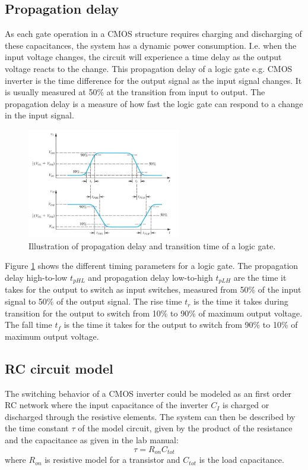 \documentclass[onecolumn]{article}
\begin{document}
\subsection{Propagation delay}
As each gate operation in a CMOS structure requires charging and discharging of these capacitances, the system has a dynamic power consumption. I.e. when the input voltage changes, the circuit will experience a time delay as the output voltage reacts to the change. This propagation delay of a logic gate e.g. CMOS inverter is the time difference for the output signal as the input signal changes. It is usually measured at 50\% at the transition from input to output. The propagation delay is a measure of how fast the logic gate can respond to a change in the input signal.

\begin{figure}[h!]
    \centering
    \includegraphics[width=0.6\textwidth]{tphl.png}
    \caption{Illustration of propagation delay and transition time of a logic gate. \cite{Sedra/Smith}}
    \label{fig:tphl}
\end{figure}

Figure \ref{fig:tphl} shows the different timing parameters for a logic gate. The propagation delay high-to-low $t_{pHL}$ and propagation delay low-to-high $t_{pLH}$ are the time it takes for the output to switch as input switches, measured from 50\% of the input signal to 50\% of the output signal. The rise time $t_{r}$ is the time it takes during transition for the output to switch from 10\% to 90\% of maximum output voltage. The fall time $t_{f}$ is the time it takes for the output to switch from 90\% to 10\% of maximum output voltage.

\subsection{RC circuit model}
The switching behavior of a CMOS inverter could be modeled as an first order RC network where the input capacitance of the inverter $C_I$ is charged or discharged through the resistive elements. The system can then be described by the time constant $\tau$ of the model circuit, given by the product of the resistance and the capacitance as given in the lab manual:
\begin{equation}\label{eq:tau} \tau = R_{on}C_{tot}\end{equation}
 where $R_{on}$ is resistive model for a transistor and $C_{tot}$ is the load capacitance.
\end{document}
